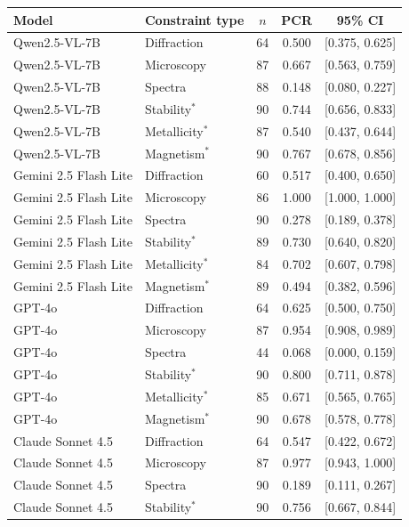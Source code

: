 \documentclass[11pt]{article}
\begin{document}
\begin{table}[h]
\centering
{\scriptsize\setlength{\tabcolsep}{4pt}\renewcommand{\arraystretch}{1.05}
\begin{tabular}{l l S[table-format=3.0] S[table-format=1.3] c}
\toprule
Model & Constraint type & {$n$} & {PCR} & {95\% CI} \\
\midrule
Qwen2.5-VL-7B & Diffraction & 64 & 0.500 & [0.375, 0.625] \\
Qwen2.5-VL-7B & Microscopy & 87 & 0.667 & [0.563, 0.759] \\
Qwen2.5-VL-7B & Spectra & 88 & 0.148 & [0.080, 0.227] \\
Qwen2.5-VL-7B & Stability$^{*}$ & 90 & 0.744 & [0.656, 0.833] \\
Qwen2.5-VL-7B & Metallicity$^{*}$ & 87 & 0.540 & [0.437, 0.644] \\
Qwen2.5-VL-7B & Magnetism$^{*}$ & 90 & 0.767 & [0.678, 0.856] \\
\addlinespace
Gemini 2.5 Flash Lite & Diffraction & 60 & 0.517 & [0.400, 0.650] \\
Gemini 2.5 Flash Lite & Microscopy & 86 & 1.000 & [1.000, 1.000] \\
Gemini 2.5 Flash Lite & Spectra & 90 & 0.278 & [0.189, 0.378] \\
Gemini 2.5 Flash Lite & Stability$^{*}$ & 89 & 0.730 & [0.640, 0.820] \\
Gemini 2.5 Flash Lite & Metallicity$^{*}$ & 84 & 0.702 & [0.607, 0.798] \\
Gemini 2.5 Flash Lite & Magnetism$^{*}$ & 89 & 0.494 & [0.382, 0.596] \\
\addlinespace
GPT-4o & Diffraction & 64 & 0.625 & [0.500, 0.750] \\
GPT-4o & Microscopy & 87 & 0.954 & [0.908, 0.989] \\
GPT-4o & Spectra & 44 & 0.068 & [0.000, 0.159] \\
GPT-4o & Stability$^{*}$ & 90 & 0.800 & [0.711, 0.878] \\
GPT-4o & Metallicity$^{*}$ & 85 & 0.671 & [0.565, 0.765] \\
GPT-4o & Magnetism$^{*}$ & 90 & 0.678 & [0.578, 0.778] \\
\addlinespace
Claude Sonnet 4.5 & Diffraction & 64 & 0.547 & [0.422, 0.672] \\
Claude Sonnet 4.5 & Microscopy & 87 & 0.977 & [0.943, 1.000] \\
Claude Sonnet 4.5 & Spectra & 90 & 0.189 & [0.111, 0.267] \\
Claude Sonnet 4.5 & Stability$^{*}$ & 90 & 0.756 & [0.667, 0.844] \\

\end{tabular}}
\end{table}
\end{document}
